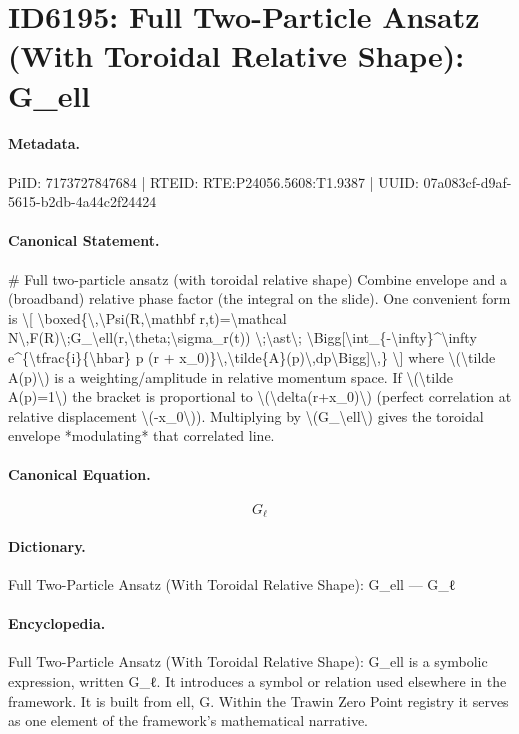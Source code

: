 \section*{ID6195: Full Two-Particle Ansatz (With Toroidal Relative Shape): G\_ell}
\paragraph{Metadata.}
PiID: 7173727847684 | RTEID: RTE:P24056.5608:T1.9387 | UUID: 07a083cf-d9af-5615-b2db-4a44c2f24424

\paragraph{Canonical Statement.}
\# Full two-particle ansatz (with toroidal relative shape) Combine envelope and a (broadband) relative phase factor (the integral on the slide). One convenient form is \textbackslash{}[ \textbackslash{}boxed\{\textbackslash{},\textbackslash{}Psi(R,\textbackslash{}mathbf r,t)=\textbackslash{}mathcal N\textbackslash{},F(R)\textbackslash{};G\_\textbackslash{}ell(r,\textbackslash{}theta;\textbackslash{}sigma\_r(t)) \textbackslash{};\textbackslash{}ast\textbackslash{}; \textbackslash{}Bigg[\textbackslash{}int\_\{-\textbackslash{}infty\}\textasciicircum{}\textbackslash{}infty e\textasciicircum{}\{\textbackslash{}tfrac\{i\}\{\textbackslash{}hbar\} p (r + x\_0)\}\textbackslash{},\textbackslash{}tilde\{A\}(p)\textbackslash{},dp\textbackslash{}Bigg]\textbackslash{},\} \textbackslash{}] where \textbackslash{}(\textbackslash{}tilde A(p)\textbackslash{}) is a weighting/amplitude in relative momentum space. If \textbackslash{}(\textbackslash{}tilde A(p)=1\textbackslash{}) the bracket is proportional to \textbackslash{}(\textbackslash{}delta(r+x\_0)\textbackslash{}) (perfect correlation at relative displacement \textbackslash{}(-x\_0\textbackslash{})). Multiplying by \textbackslash{}(G\_\textbackslash{}ell\textbackslash{}) gives the toroidal envelope *modulating* that correlated line.

\paragraph{Canonical Equation.}
\[
G_\ell
\]

\paragraph{Dictionary.}
Full Two-Particle Ansatz (With Toroidal Relative Shape): G\_ell — G\_ℓ

\paragraph{Encyclopedia.}
Full Two-Particle Ansatz (With Toroidal Relative Shape): G\_ell is a symbolic expression, written G\_ℓ. It introduces a symbol or relation used elsewhere in the framework. It is built from ell, G. Within the Trawin Zero Point registry it serves as one element of the framework's mathematical narrative.
